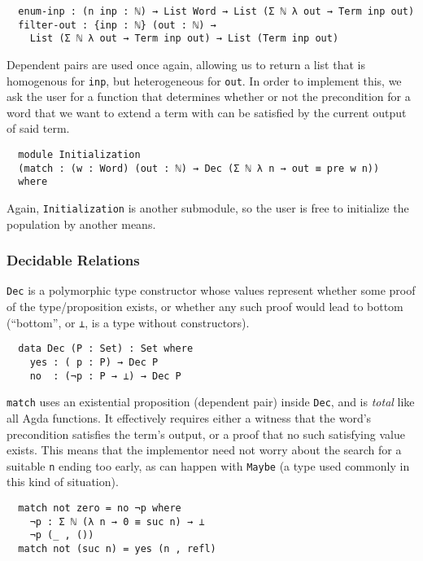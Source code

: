 \documentclass[runningheads,a4paper]{llncs}
\begin{document}
\begin{verbatim}
  enum-inp : (n inp : ℕ) → List Word → List (Σ ℕ λ out → Term inp out)
  filter-out : {inp : ℕ} (out : ℕ) →
    List (Σ ℕ λ out → Term inp out) → List (Term inp out)
\end{verbatim}

Dependent pairs are used once again, allowing us to return a list
that is homogenous for \texttt{inp}, but heterogeneous for
\texttt{out}. In order to implement this, we ask the user for a
function that determines whether or not the precondition for a word that we
want to extend a term with can be satisfied by the current output of said
term.

\begin{verbatim}
  module Initialization
  (match : (w : Word) (out : ℕ) → Dec (Σ ℕ λ n → out ≡ pre w n))
  where
\end{verbatim}

Again, \texttt{Initialization} is another submodule, so the user
is free to initialize the population by another means.

\subsubsection{Decidable Relations}

\texttt{Dec} is a polymorphic type constructor whose values
represent whether some proof of the type/proposition exists, or
whether any such proof would lead to bottom (``bottom'', or \texttt{⊥}, is a type
without constructors).

\begin{verbatim}
  data Dec (P : Set) : Set where
    yes : ( p : P) → Dec P
    no  : (¬p : P → ⊥) → Dec P
\end{verbatim}

\texttt{match} uses an existential proposition (dependent
pair) inside \texttt{Dec}, and is \textit{total} like all Agda functions.
It effectively requires either a witness that the word's precondition
satisfies the term's output, or a proof that no such satisfying value
exists. This means that the implementor need not worry about the search
for a suitable \texttt{n} ending too early, as can happen
with \texttt{Maybe} (a type used commonly in this kind of situation).

\begin{verbatim}
  match not zero = no ¬p where
    ¬p : Σ ℕ (λ n → 0 ≡ suc n) → ⊥
    ¬p (_ , ())
  match not (suc n) = yes (n , refl)
\end{verbatim}
\end{document}
